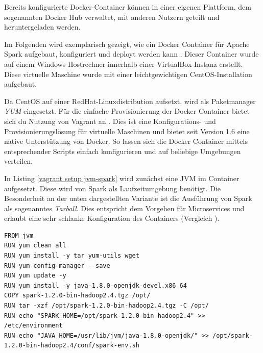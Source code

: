Bereits konfigurierte Docker-Container können in einer eigenen Plattform, dem sogenannten Docker Hub verwaltet, mit anderen Nutzern geteilt und heruntergeladen werden. 

Im Folgenden wird exemplarisch gezeigt, wie ein Docker Container für Apache Spark aufgebaut, konfiguriert und deployt werden kann . Dieser Container wurde auf einem Windows Hostrechner innerhalb einer VirtualBox-Instanz erstellt. Diese virtuelle Maschine wurde mit einer leichtgewichtigen CentOS-Installation aufgebaut. 

Da CentOS auf einer RedHat-Linuxdistribution aufsetzt, wird als Paketmanager \textit{YUM} eingesetzt. Für die einfache Provisionierung der Docker Container bietet sich du Nutzung von Vagrant an . Dies ist eine Konfigurations- und Provisionierungslösung für virtuelle Maschinen und bietet seit Version 1.6 eine native Unterstützung von Docker. So lassen sich die Docker Container mittels entsprechender Scripts einfach konfigurieren und auf beliebige Umgebungen verteilen. 

In Listing \ref{vagrant setup jvm-spark} wird zunächst eine JVM im Container aufgesetzt. Diese wird von Spark als Laufzeitumgebung benötigt. Die Besonderheit an der unten dargestellten Variante ist die Ausführung von Spark als sogenanntes \textit{Tarball}. Dies entspricht dem Vorgehen für Microservices und erlaubt eine sehr schlanke Konfiguration des Containers (Vergleich ).

\begin{lstlisting}[label=vagrant setup jvm-spark,caption=Setup Spark mit eigener JVM]
FROM jvm
RUN yum clean all
RUN yum install -y tar yum-utils wget
RUN yum-config-manager --save 
RUN yum update -y
RUN yum install -y java-1.8.0-openjdk-devel.x86_64
COPY spark-1.2.0-bin-hadoop2.4.tgz /opt/
RUN tar -xzf /opt/spark-1.2.0-bin-hadoop2.4.tgz -C /opt/
RUN echo "SPARK_HOME=/opt/spark-1.2.0-bin-hadoop2.4" >> /etc/environment
RUN echo "JAVA_HOME=/usr/lib/jvm/java-1.8.0-openjdk/" >> /opt/spark-1.2.0-bin-hadoop2.4/conf/spark-env.sh

\end{lstlisting}

